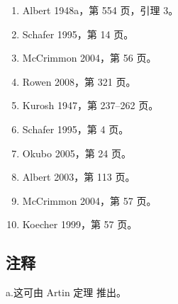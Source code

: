 \begin{enumerate}
\item Albert 1948a，第 554 页，引理 3。
\item Schafer 1995，第 14 页。
\item McCrimmon 2004，第 56 页。
\item Rowen 2008，第 321 页。
\item Kurosh 1947，第 237–262 页。
\item Schafer 1995，第 4 页。
\item Okubo 2005，第 24 页。
\item Albert 2003，第 113 页。
\item McCrimmon 2004，第 57 页。
\item Koecher 1999，第 57 页。
\end{enumerate}
\subsection{注释}

a.这可由 Artin 定理 推出。
